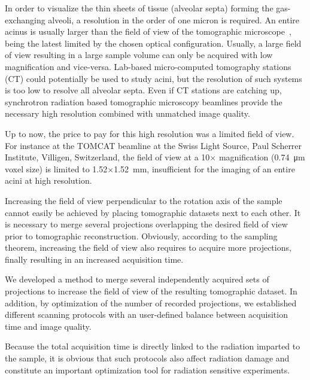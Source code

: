 \documentclass[preprint,s]{iucr}
\begin{document}
In order to visualize the thin sheets of tissue (alveolar septa) forming the gas-exchanging alveoli, a resolution in the order of one micron is required. An entire acinus is usually larger than the field of view of the tomographic microscope~\cite{Rodriguez1987}, being the latest limited by the chosen optical configuration. Usually, a large field of view resulting in a large sample volume can only be acquired with low magnification and vice-versa. Lab-based micro-computed tomography stations (\micro CT) could potentially be used to study acini, but the resolution of such systems is too low to resolve all alveolar septa. Even if \micro CT stations are catching up, synchrotron radiation based tomographic microscopy beamlines provide the necessary high resolution combined with unmatched image quality.

Up to now, the price to pay for this high resolution was a limited field of view. For instance at the TOMCAT beamline \cite{Stampanoni2007} at the Swiss Light Source, Paul Scherrer Institute, Villigen, Switzerland, the field of view at a 10$\times$ magnification (\SI{0.74}{\micro\meter} voxel size) is limited to 1.52$\times$\SI{1.52}{\milli\meter}, insufficient for the imaging of an entire acini at high resolution.

Increasing the field of view perpendicular to the rotation axis of the sample cannot easily be achieved by placing tomographic datasets next to each other. It is necessary to merge several projections overlapping the desired field of view prior to tomographic reconstruction. Obviously, according to the sampling theorem, increasing the field of view also requires to acquire more projections, finally resulting in an increased acquisition time.

We developed a method to merge several independently acquired sets of projections to increase the field of view of the resulting tomographic dataset. In addition, by optimization of the number of recorded projections, we established different scanning protocols with an user-defined balance between acquisition time and image quality.

Because the total acquisition time is directly linked to the radiation imparted to the sample, it is obvious that such protocols also affect radiation damage and constitute an important optimization tool for radiation sensitive experiments.
\end{document}
